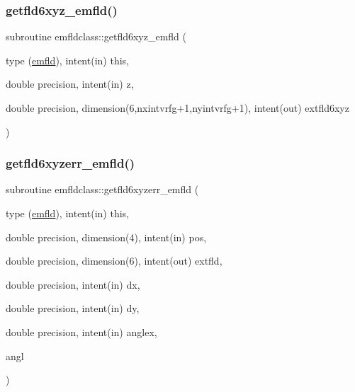 \mbox{\label{namespaceemfldclass_a6a4833c66a8430fe7d7c3e005dd34c6e}} 
\subsubsection{\texorpdfstring{getfld6xyz\_emfld()}{getfld6xyz\_emfld()}}
{\footnotesize\ttfamily subroutine emfldclass\+::getfld6xyz\+\_\+emfld (\begin{DoxyParamCaption}\item[{type (\mbox{\hyperlink{namespaceemfldclass_structemfldclass_1_1emfld}{emfld}}), intent(in)}]{this,  }\item[{double precision, intent(in)}]{z,  }\item[{double precision, dimension(6,nxintvrfg+1,nyintvrfg+1), intent(out)}]{extfld6xyz }\end{DoxyParamCaption})}

\mbox{\label{namespaceemfldclass_a53a2dd6514711afd20442dab5686c5a4}} 
\subsubsection{\texorpdfstring{getfld6xyzerr\_emfld()}{getfld6xyzerr\_emfld()}}
{\footnotesize\ttfamily subroutine emfldclass\+::getfld6xyzerr\+\_\+emfld (\begin{DoxyParamCaption}\item[{type (\mbox{\hyperlink{namespaceemfldclass_structemfldclass_1_1emfld}{emfld}}), intent(in)}]{this,  }\item[{double precision, dimension(4), intent(in)}]{pos,  }\item[{double precision, dimension(6), intent(out)}]{extfld,  }\item[{double precision, intent(in)}]{dx,  }\item[{double precision, intent(in)}]{dy,  }\item[{double precision, intent(in)}]{anglex,  }\item[{}]{angl }\end{DoxyParamCaption})}

\mbox{\label{namespaceemfldclass_aa0023b4b2c7a17c75becc20eeb9be23c}} 
